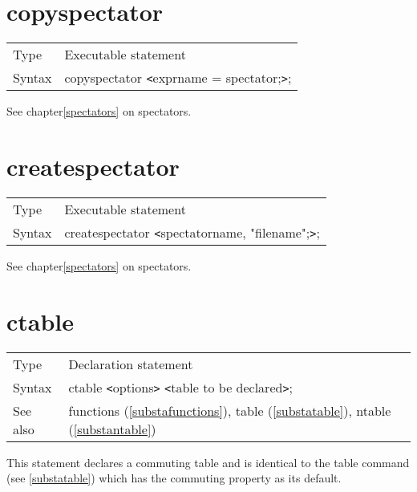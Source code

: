 
\section{copyspectator}
\label{substacopyspectator}

\noindent \begin{tabular}{ll}
Type & Executable statement\\
Syntax & copyspectator {\tt<}exprname = spectator;{\tt>};
\end{tabular} \vspace{4mm}

\noindent See chapter\ref{spectators} on spectators.
\vspace{10mm}


\section{createspectator}
\label{substacreatespectator}

\noindent \begin{tabular}{ll}
Type & Executable statement\\
Syntax & createspectator {\tt<}spectatorname, "filename";{\tt>};
\end{tabular} \vspace{4mm}

\noindent See chapter\ref{spectators} on spectators.
\vspace{10mm}


\section{ctable}
\label{substactable}

\noindent \begin{tabular}{ll}
Type & Declaration statement\\
Syntax & ctable {\tt<}options{\tt>} {\tt<}table to be 
declared{\tt>}; \\
See also & functions (\ref{substafunctions}), table (\ref{substatable}),
        ntable (\ref{substantable})
\end{tabular} \vspace{4mm}

\noindent This statement declares a commuting 
table and is identical to the table command (see 
\ref{substatable}) which has the commuting property as its default. 
\vspace{10mm}


